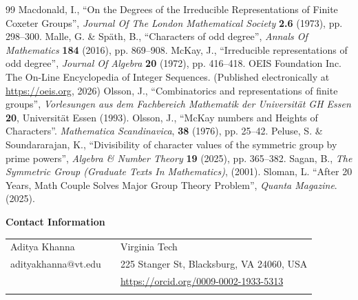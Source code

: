 \documentclass[12pt]{amsart}
\theoremstyle{definition}
\numberwithin{equation}{section}
\begin{document}
\begin{thebibliography}{99}
 Macdonald, I., ``On the Degrees of the Irreducible Representations of Finite Coxeter Groups'', {\em Journal Of The London Mathematical Society} \textbf{2.6} (1973), pp. 298--300.
Malle, G. \& Späth, B., ``Characters of odd degree'', {\em Annals Of Mathematics} \textbf{184} (2016), pp. 869--908.
McKay, J., ``Irreducible representations of odd degree'', {\em Journal Of Algebra} \textbf{20} (1972), pp. 416--418.
 OEIS Foundation Inc. The On-Line Encyclopedia of Integer Sequences. (Published electronically at \url{https://oeis.org}, 2026)
 Olsson, J., ``Combinatorics and representations of finite groups'', \textit{Vorlesungen aus dem Fachbereich Mathematik der Universität GH Essen} \textbf{20}, Universität Essen (1993).
 Olsson, J., ``McKay numbers and Heights of Characters''. {\em Mathematica Scandinavica}, \textbf{38} (1976), pp. 25--42.
Peluse, S. \& Soundararajan, K., ``Divisibility of character values of the symmetric group by prime powers'', {\em Algebra \& Number Theory} \textbf{19} (2025), pp. 365--382.
 Sagan, B., \emph{The Symmetric Group (Graduate Texts In Mathematics)}, (2001).
 Sloman, L. ``After 20 Years, Math Couple Solves Major Group Theory Problem'', {\em Quanta Magazine}. (2025).
\end{thebibliography}
\bigskip
{\bf \large Contact Information}\\

\begin{tabular}{lcl}
Aditya Khanna	&& Virginia Tech\\
adityakhanna$@$vt.edu && 225 Stanger St, Blacksburg, VA 24060, USA\\
	&& 
    \url{https://orcid.org/0009-0002-1933-5313}\\
				&& \\
                \end{tabular}
\end{document}
